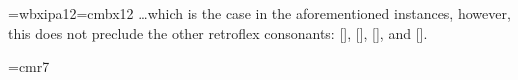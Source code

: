 \vs{5pt}
{\font\twelvebfipa=wbxipa12\font\twelvebf=cmbx12\def\bf{\fam\bffam\twelvebf
\def\ipa{\twelvebfipa}}%
\bf\dots which is the case in the aforementioned instances, however, {\bf this
does not preclude the other retroflex consonants: [\nj], [\taill], [\taild],
and [\tailr]}.
}

\parindent 0pt

\def\oct#1{\hbox{\rm\'{}\kern-.1em\it#1\/\kern.05em}}
\def\hex#1{\hbox{\rm\H{}\tt#1}} %

\abovedisplayskip=3pt\belowdisplayskip=2pt
\font\smalltextfont=cmr7
\newcount\fontcount
\newbox\charbox
\def\oddline#1{\cr
  \noalign{\nointerlineskip}
  \multispan{19}\hrulefill&
  \setbox\charbox=\hbox{\lower 2.3pt\hbox{\hex{#1x}}}
                       \smash{\box\charbox}\cr
                        \noalign{\nointerlineskip}}
\def\evenline{\cr\noalign{\hrule}}
\def\chartstrut{\lower3.5pt\vbox to14pt{}}
\def\beginchart#1{ \global\fontcount=0 #1
  \halign to\hsize\bgroup
    \chartstrut##\tabskip0pt plus10pt&
    &\hfil##\hfil&\vrule##\cr
    \lower6.5pt\null
    &&&\oct0&&\oct1&&\oct2&&\oct3&&\oct4&&\oct5&&\oct6&&\oct7&\evenline}
\def\endchart{\raise11.5pt\null&&&\hex 8&&\hex 9&&\hex A&&\hex B&
  &\hex C&&\hex D&&\hex E&&\hex F&\cr\egroup}
\def\:{\setbox\charbox=%
\hbox{\char\fontcount
}%
  \ifdim\ht\charbox>7.5pt\reposition
  \else\ifdim\dp\charbox>2.5pt\reposition
  \else\ifdim\wd\charbox>0pt
       \ifdim\ht\charbox<.01pt
       \ifdim\dp\charbox<.01pt\unposition\fi\fi\fi\fi\fi
  \box\charbox\global\advance\fontcount by1 }
\def\reposition{}%
\def\unposition{\setbox\charbox=\hbox{\smalltextfont undef}}
\def\normalchart{%
  &\oct{00x}&&\:&&\:&&\:&&\:&&\:&&\:&&\:&&\:&&\oddline0
  &\oct{01x}&&\:&&\:&&\:&&\:&&\:&&\:&&\:&&\:&\evenline
  &\oct{02x}&&\:&&\:&&\:&&\:&&\:&&\:&&\:&&\:&&\oddline1
  &\oct{03x}&&\:&&\:&&\:&&\:&&\:&&\:&&\:&&\:&\evenline
  &\oct{04x}&&\:&&\:&&\:&&\:&&\:&&\:&&\:&&\:&&\oddline2
  &\oct{05x}&&\:&&\:&&\:&&\:&&\:&&\:&&\:&&\:&\evenline
  &\oct{06x}&&\:&&\:&&\:&&\:&&\:&&\:&&\:&&\:&&\oddline3
  &\oct{07x}&&\:&&\:&&\:&&\:&&\:&&\:&&\:&&\:&\evenline
  &\oct{10x}&&\:&&\:&&\:&&\:&&\:&&\:&&\:&&\:&&\oddline4
  &\oct{11x}&&\:&&\:&&\:&&\:&&\:&&\:&&\:&&\:&\evenline
  &\oct{12x}&&\:&&\:&&\:&&\:&&\:&&\:&&\:&&\:&&\oddline5
  &\oct{13x}&&\:&&\:&&\:&&\:&&\:&&\:&&\:&&\:&\evenline
  &\oct{14x}&&\:&&\:&&\:&&\:&&\:&&\:&&\:&&\:&&\oddline6
  &\oct{15x}&&\:&&\:&&\:&&\:&&\:&&\:&&\:&&\:&\evenline
  &\oct{16x}&&\:&&\:&&\:&&\:&&\:&&\:&&\:&&\:&&\oddline7
  &\oct{17x}&&\:&&\:&&\:&&\:&&\:&&\:&&\:&&\:&\evenline}

